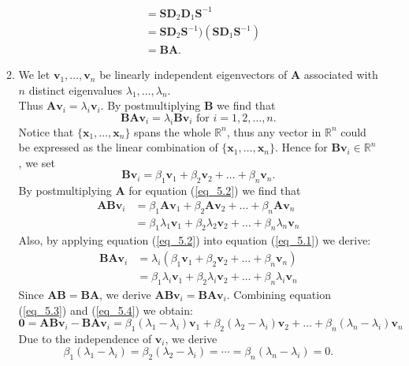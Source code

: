 \begin{enumerate}
\begin{enumerate}
\begin{align*}
&=\bm S\bm D_2\bm D_1\bm S^{-1}\\
&=\bm S\bm D_2\bm S^{-1})(\bm S\bm D_1\bm S^{-1})\\
&=\bm{BA}.
\end{align*}
\item
We let $\bm v_1,\dots,\bm v_n$ be linearly independent eigenvectors of $\bm A$ associated with $n$ distinct eigenvalues $\lambda_1,\dots,\lambda_n$. \\
Thus $\bm A\bm v_i=\lambda_i\bm v_i$. By postmultiplying $\bm B$ we find that
\begin{equation}
\label{eq_5.1}
\bm{BA}\bm v_i=\lambda_i\bm B\bm v_i\text{ for }i=1,2,\dots,n.
\end{equation}
Notice that $\{\bm x_1,\dots,\bm x_n\}$ spans the whole $\mathbb{R}^n$, thus any vector in $\mathbb{R}^n$ could be expressed as the linear combination of $\{\bm x_1,\dots,\bm x_n\}$. Hence for $\bm B\bm v_i\in\mathbb{R}^n$, we set
\begin{equation}\label{eq_5.2}
\bm B\bm v_i=\beta_1\bm v_1+\beta_2\bm v_2+\dots+\beta_n\bm v_n.
\end{equation}
By postmultiplying $\bm A$ for equation (\ref{eq_5.2}) we find that
\begin{equation}
\begin{aligned}\label{eq_5.3}
\bm{AB}\bm v_i&=\beta_1\bm A\bm v_1+\beta_2\bm A\bm v_2+\dots+\beta_n\bm A\bm v_n\\
&=\beta_1\lambda_1\bm v_1+\beta_2\lambda_2\bm v_2+\dots+\beta_n\lambda_n\bm v_n
\end{aligned}
\end{equation}
Also, by applying equation (\ref{eq_5.2}) into equation (\ref{eq_5.1}) we derive:
\begin{equation}\label{eq_5.4}
\begin{aligned}
\bm{BA}\bm v_i&=\lambda_i(\beta_1\bm v_1+\beta_2\bm v_2+\dots+\beta_n\bm v_n)\\
&=\beta_1\lambda_i\bm v_1+\beta_2\lambda_i\bm v_2+\dots+\beta_n\lambda_i\bm v_n
\end{aligned}
\end{equation}
Since $\bm{AB}=\bm{BA}$, we derive $\bm{AB}\bm v_i=\bm{BA}\bm v_i$. Combining equation (\ref{eq_5.3}) and (\ref{eq_5.4}) we obtain:
\[
\bm0=\bm{AB}\bm v_i-\bm{BA}\bm v_i
=\beta_1(\lambda_1-\lambda_i)\bm v_1+\beta_2(\lambda_2-\lambda_i)\bm v_2+\dots+\beta_n(\lambda_n-\lambda_i)\bm v_n
\]
Due to the independence of $\bm v_i$, we derive 
\[
\beta_1(\lambda_1-\lambda_i)=\beta_2(\lambda_2-\lambda_i)=\cdots=\beta_n(\lambda_n-\lambda_i)=0.
\]
\end{enumerate}
\end{enumerate}
